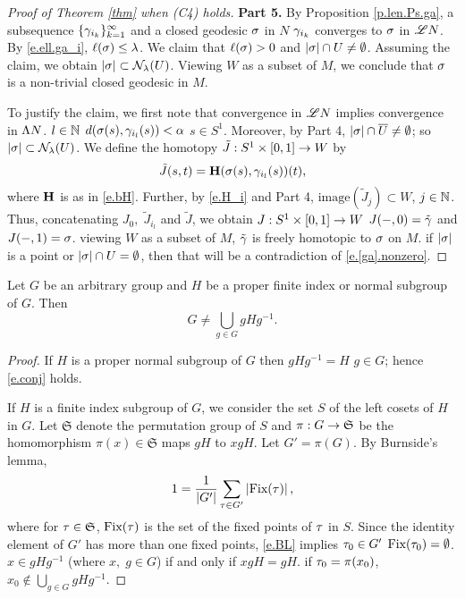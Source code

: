 \documentclass[11pt,twoside]{article}
\begin{document}
\begin{proof}[Proof of Theorem \ref{thm} when (C4) holds]
	\noindent\textbf{Part 5.} By Proposition \ref{p.len.Ps.ga}, \tes a subsequence \(\{\gamma_{i_k}\}_{k=1}^{\infty}\) and a closed geodesic \(\sigma\) in \(N\) \st \(\gamma_{i_k}\) converges to \(\sigma\) in \(\mathscr{L} N\). By \eqref{e.ell.ga_i}, \(\ell(\sigma)\leq \lambda\). We claim that \(\ell(\sigma)>0\) and \(\left|\sigma\right|\cap U\neq \emptyset\). Assuming the claim, we obtain \(\left|\sigma\right|\subset \mathcal{N}_{\lambda}(U)\). Viewing \(W\) as a subset of \(M\), we conclude that \(\sigma\) is a non-trivial closed geodesic in \(M\).
	
	To justify the claim, we first note that convergence in \(\mathscr{L} N\) implies convergence in \(\Lambda N\). \tf \tes \(l\in \mathbb{N}\) \st \(d(\sigma(s),\gamma_{i_l}(s)) < \alpha\) \fa \(s\in S^1\). Moreover, by Part 4, \(\left|\sigma\right|\cap \overline{U}\neq \emptyset\); so \(\left|\sigma\right|\subset \mathcal{N}_{\lambda}(U)\). We define the homotopy \(\tilde{J}:S^1\times [0,1]\rightarrow W\) by \[\tilde{J}(s,t)=\mathbf{H}(\sigma(s),\gamma_{i_l}(s))(t),\] where \(\mathbf{H}\) is as in \eqref{e.bH}. Further, by \eqref{e.H_i} and Part 4, \(\text{image}(\tilde{J}_j)\subset W\), \fa \(j\in \mathbb{N}\). Thus, concatenating \(J_0,\;\tilde{J}_{i_l}\) and \(\tilde{J}\), we obtain \(J:S^1\times [0,1]\rightarrow W\) \st \(J(-,0)=\tilde{\gamma}\) and \(J(-,1)=\sigma\). \tf viewing \(W\) as a subset of \(M\), $\tilde{\gamma}$ is freely homotopic to $\sigma$ on $M$. \hn if \(\left|\sigma\right|\) is a point or \(\left|\sigma\right|\cap U=\emptyset\), then that will be a contradiction of \eqref{e.[ga].nonzero}. 
	
\end{proof}

\begin{lem}\label{l.conj}
Let \(G\) be an arbitrary group and \(H\) be a proper finite index or normal subgroup of \(G\). Then
\begin{equation}\label{e.conj}
G\neq \bigcup_{g\in G}gHg^{-1}.
\end{equation}
 
\end{lem}
 \begin{proof}
If $H$ is a proper normal subgroup of \(G\) then \(gHg^{-1}=H\) \fa \(g\in G\); hence \eqref{e.conj} holds.
 
If $H$ is a finite index subgroup of $G$, we consider the set $S$ of the left cosets of $H$ in $G$. Let $\mathfrak{S}$ denote the permutation group of $S$ and \(\pi:G\rightarrow \mathfrak{S}\) be the homomorphism \sot \(\pi(x)\in \mathfrak{S}\) maps \(gH\) to \(xgH\). Let $G'=\pi(G)$. By Burnside's lemma,
\begin{equation}\label{e.BL}
1=\frac{1}{\left|G'\right|}\sum_{\tau\in G'}\left|\text{Fix}(\tau)\right|,
\end{equation}
where for $\tau\in \mathfrak{S}$, \(\text{Fix}(\tau)\) is the set of the fixed points of $\tau$ in $S$. Since the identity element of \(G'\) has more than one fixed points, \eqref{e.BL} implies \tes \(\tau_0\in G'\) \st \(\text{Fix}(\tau_0)=\emptyset\). \(x\in gHg^{-1}\) (where $x,\; g\in G$) if and only if \(xgH=gH\). \tf if \(\tau_0=\pi(x_0)\), \(x_0\notin  \bigcup\limits_{g\in G}gHg^{-1}.\)
\end{proof}
\end{document}
